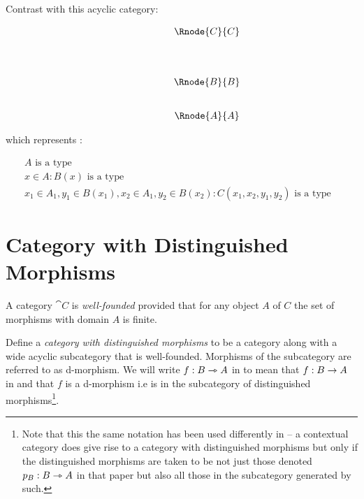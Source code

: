 \documentclass[10pt,a4paper]{scrartcl}
\begin{document}
\noindent
Contrast with this acyclic category:
\begin{center}
\begin{equation}
\begin{array}{p{1.5cm}cccp{2cm}c}
&                & \Rnode{C}{C}&   \\ [1.4cm]
&                & \Rnode{B}{B} &  \\ [0.8cm]
&                & \Rnode{A}{A} &  
\end{array}
\end{equation}
\setlength {\saroffsetA}{-2pt}
\setlength {\saroffsetB}{-2pt}
\setlength {\saroffsetA}{2pt}
\setlength {\saroffsetB}{2pt}
\sarreset
\end{center}
\noindent
which represents :
\addtocounter{equation}{-1}
\begin{align}
&A\mbox{ is a type} && \tag*{(\theequation a)}\\
&x\in A: B(x) \mbox{ is a type} && \tag*{(\theequation b)}\\
&x_1\in A_1, y_1 \in B(x_1), x_2\in A_1, y_2 \in B(x_2) : C(x_1,x_2,y_1,y_2) \mbox{ is a type} && \tag*{(\theequation c)}
\end{align}

\section{Category with Distinguished Morphisms}

\begin{definition}
\noindent A category $\cat{C}$ is \textit{well-founded} provided that for 
any object $A$ of $C$ the set of morphisms with domain $A$ is finite. 
\end{definition}
\begin{definition}
Define a \textit{category with distinguished morphisms} to be a category  along with a wide acyclic subcategory  that is well-founded. 
Morphisms of the subcategory are referred to as d-morphism. 
We will write $f:B \rightarrowtriangle A$ in 
to mean that 
$f: B \rightarrow A$ in  and that $f$ is a d-morphism i.e is in the subcategory  of distinguished morphisms\footnote{
Note that this the same notation has been used differently in \cite{Cartmell86} -- a contextual category does give rise to a category with distinguished morphisms but only
if the distinguished morphisms are taken to be not just those
denoted $p_B: B \rightarrowtriangle A$ in that paper
but also all those in  the subcategory generated by such.
}. 
\end{definition} 
\end{document}

